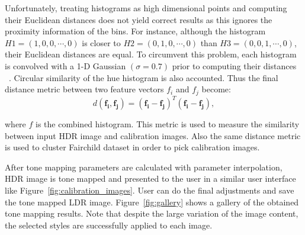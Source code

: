 Unfortunately, treating histograms as high dimensional points and computing their Euclidean distances does not yield correct results as this ignores the proximity information of the bins. For instance, although the histogram $H1 = (1, 0, 0, \cdots, 0)$ is closer to
$H2 = (0, 1, 0, \cdots, 0)$ than $H3 = (0, 0, 1, \cdots, 0)$, their Euclidean distances are equal. To circumvent this problem, each histogram is convolved with a 1-D Gaussian $(\sigma = 0.7)$ prior to computing their distances ~\cite{Ben2006}. Circular similarity of the hue histogram is also accounted. Thus the final distance metric between two feature vectors \textbf{$f_i$} and \textbf{$f_j$} become:
\begin{equation}
\label{eq:distance_metric}
    d(\mathbf{f_i, f_j}) = \mathbf{(f_i - f_j)}^T\mathbf{(f_i-f_j)},
\end{equation}

where \textbf{$f$} is the combined histogram. This metric is used to measure the similarity between input HDR image and calibration images. Also the same distance metric is used to cluster Fairchild dataset in order to pick calibration images.

After tone mapping parameters are calculated with parameter interpolation, HDR image is tone mapped and presented to the user in a similar user interface like Figure~\ref{fig:calibration_images}. User can do the final adjustments and save the tone mapped LDR image. Figure~\ref{fig:gallery} shows a gallery of the obtained tone mapping results. Note that despite the large variation of the image content, the selected styles are successfully applied to each image.


